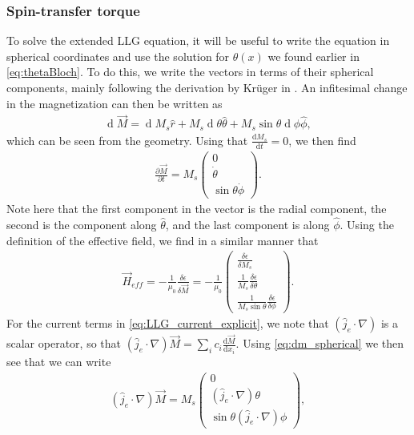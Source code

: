 \documentclass[12pt, a4paper, twoside, openright]{article}		%
\renewcommand{\d}[1]{\ensuremath{\operatorname{d}\!{#1}}}
\numberwithin{equation}{section}
\begin{document}
\subsubsection{Spin-transfer torque}
To solve the extended LLG equation, it will be useful to write the equation in spherical coordinates and use the solution for $\theta(x)$ we found earlier in \eqref{eq:thetaBloch}. To do this, we write the vectors in terms of their spherical components, mainly following the derivation by Kr\"{u}ger in \cite{kruger2006current}. An infitesimal change in the magnetization can then be written as
\begin{align}
\label{eq:dm_spherical}
\d {\vec{M}} = \d M_s \hat{r} + M_s \d {\theta} \hat{\theta} + M_s\sin\theta\d {\phi} \hat{\phi},
\end{align}
which can be seen from the geometry. Using that $\frac{\textrm{d} M_s}{\textrm{d} t} = 0$, we then find
\begin{align}
\frac{\partial \vec{M}}{\partial t} = M_s
\begin{pmatrix}
0 \\ 
\dot{\theta} \\ 
\sin\theta\dot{\phi}
\end{pmatrix}.
\end{align}
Note here that the first component in the vector is the radial component, the second is the component along $\hat{\theta}$, and the last component is along $\hat{\phi}$. Using the definition of the effective field, we find in a similar manner that
\begin{align}
\vec{H}_{eff} = -\frac{1}{\mu_0} \frac{\delta \epsilon}{\delta \vec{M}} = -\frac{1}{\mu_0}
\begin{pmatrix}
\frac{\delta \epsilon}{\delta M_s} \\ 
\frac{1}{M_s} \frac{\delta \epsilon}{\delta \theta} \\ 
\frac{1}{M_s\sin\theta} \frac{\delta \epsilon}{\delta \phi}
\end{pmatrix}.
\end{align}
For the current terms in \eqref{eq:LLG_current_explicit}, we note that $(\hat{j}_e\cdot\nabla)$ is a scalar operator, so that $(\hat{j}_e\cdot\nabla)\vec{M} = \sum_i c_i \frac{\textrm{d} \vec{M}}{\textrm{d} x_i}$. Using \eqref{eq:dm_spherical} we then see that we can write
\begin{align}
(\hat{j}_e\cdot\nabla)\vec{M} = M_s
\begin{pmatrix}
0 \\ 
(\hat{j}_e\cdot\nabla)\theta \\ 
\sin\theta(\hat{j}_e\cdot\nabla)\phi
\end{pmatrix},
\end{align}
\end{document}
